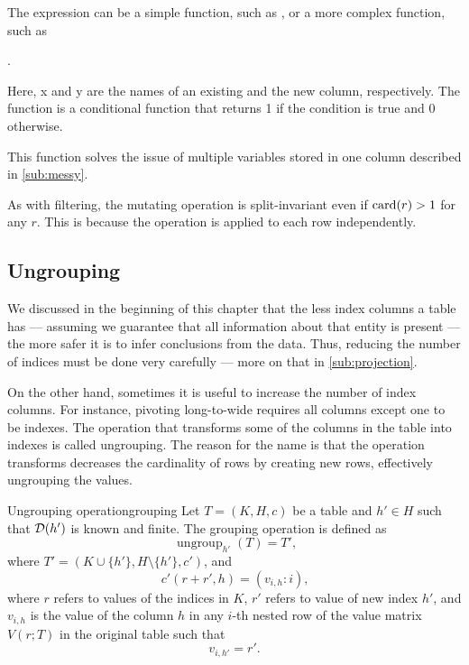 The expression can be a simple function, such as , or a more complex
function, such as
\begin{center}
  .
\end{center}
Here, x and y are the names of an existing and the new column, respectively. The
 function is a conditional function that returns 1 if the condition
is true and 0 otherwise.

This function solves the issue of multiple variables stored in one column described in
\cref{sub:messy}.

As with filtering, the mutating operation is split-invariant even if $\rowcard[r] > 1$ for
any $r$.  This is because the operation is applied to each row independently.

\subsection{Ungrouping}

We discussed in the beginning of this chapter that the less index columns a table has ---
assuming we guarantee that all information about that entity is present --- the more
safer it is to infer conclusions from the data.  Thus, reducing the number of indices
must be done very carefully --- more on that in \cref{sub:projection}.

On the other hand, sometimes it is useful to increase the number of index columns.  For
instance, pivoting long-to-wide requires all columns except one to be indexes.  The
operation that transforms some of the columns in the table into indexes is called ungrouping.
The reason for the name is that the operation transforms decreases the cardinality of rows
by creating new rows, effectively ungrouping the values.

\begin{defbox}{Ungrouping operation}{grouping}
  Let $T = (K, H, c)$ be a table and $h' \in H$ such that $\domainof{h'}$ is known and
  finite.  The grouping operation is defined as \[
    \operatorname{ungroup}_{h'}(T) = T'\text{,}
  \] where $T' = (K \cup \{h'\}, H \setminus \{h'\}, c')$, and \[
    c'(r + r', h) = (v_{i,h} : i)\text{,}
  \] where $r$ refers to values of the indices in $K$, $r'$ refers to value of new index
  $h'$, and $v_{i,h}$ is the value of the column $h$ in any $i$-th nested row of the value
  matrix $V(r; T)$ in the original table such that \[
    v_{i, h'} = r'\text{.}
  \]
\end{defbox}

